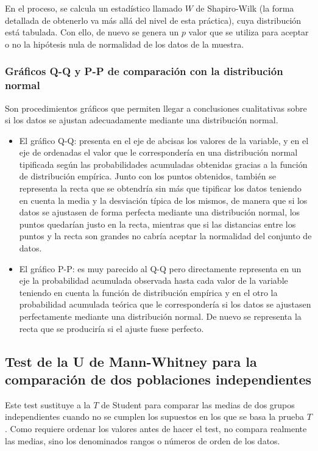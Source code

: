 \begin{description}
En el proceso, se calcula un estadístico llamado $W$ de Shapiro-Wilk (la forma detallada de obtenerlo va más allá del nivel de esta práctica), cuya distribución está tabulada. Con ello, de nuevo se genera un $p$ valor que se utiliza para aceptar o no la hipótesis nula de normalidad de los datos de la muestra.


\subsubsection{Gráficos Q-Q y P-P de comparación con la distribución normal}
Son procedimientos gráficos que permiten llegar a conclusiones cualitativas sobre si los datos se ajustan adecuadamente mediante una distribución normal.

\begin{itemize}
\item El gráfico Q-Q: presenta en el eje de abcisas
los valores de la variable, y en el eje de ordenadas el valor que
le correspondería en una distribución normal tipificada según las
probabilidades acumuladas obtenidas gracias a la función de
distribución empírica. Junto con los puntos obtenidos, también se representa la recta que se obtendría sin más
que tipificar los datos teniendo en cuenta la media y la
desviación típica de los mismos, de manera que si los datos se ajustasen de
forma perfecta mediante una distribución normal, los puntos
quedarían justo en la recta, mientras que si las distancias entre los puntos y la recta son grandes no cabría aceptar la normalidad del conjunto de datos.

\item El gráfico P-P: es muy parecido al Q-Q pero directamente representa en un eje la probabilidad acumulada observada hasta cada valor de la variable teniendo en cuenta la función de distribución empírica y en el otro la probabilidad acumulada teórica que le correspondería si los datos se ajustasen perfectamente mediante una distribución normal. De nuevo se representa la recta que se produciría si el ajuste fuese perfecto.
\end{itemize}


\subsection[Test U de Mann-Whitney para comparación de dos poblaciones independientes]{Test de la U de Mann-Whitney para la comparación de dos poblaciones independientes}

Este test sustituye a la $T$ de Student para comparar las medias de dos grupos independientes cuando no se cumplen los supuestos en los que se basa la prueba $T$. Como requiere ordenar los valores antes de hacer el test, no compara realmente las medias, sino los denominados rangos o números de orden de los datos.


\end{description}
